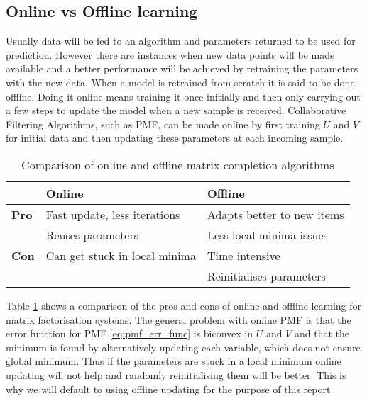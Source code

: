 \subsection{Online vs Offline learning}
Usually data will be fed to an algorithm and parameters returned to be used for prediction. However there are instances when new data points will be made available and a better performance will be achieved by retraining the parameters with the new data. When a model is retrained from scratch it is said to be done offline. Doing it online means training it once initially and then only carrying out a few steps to update the model when a new sample is received. Collaborative Filtering Algorithms, such as PMF, can be made online \cite{onlinepmf} by first training $U$ and $V$ for initial data and then updating these parameters at each incoming sample.

\begin{table}[!htb]
 \begin{tabular}{l|p{}|p{}|}
  & \textbf{Online} & \textbf{Offline} \\ \hline
  \textbf{Pro} & Fast update, less iterations  &  Adapts better to new items \\
 & Reuses parameters  & Less local minima issues   \\  \hline
    \textbf{Con} &   Can get stuck in local minima  &     Time intensive    \\
    & & Reinitialises parameters \\
    \hline
 \end{tabular}
 \caption{Comparison of online and offline matrix completion algorithms}
 \label{table:online_offline}
\end{table}


Table \ref{table:online_offline} shows a comparison of the pros and cons of online and offline learning for matrix factorisation systems. The general problem with online PMF is that the error function for PMF \ref{eq:pmf_err_func} is biconvex in $U$ and $V$ and that the minimum is found by alternatively updating each variable, which does not ensure global minimum. Thus if the parameters are stuck in a local minimum online updating will not help and randomly reinitialising them will be better. This is why we will default to using offline updating for the purpose of this report.


